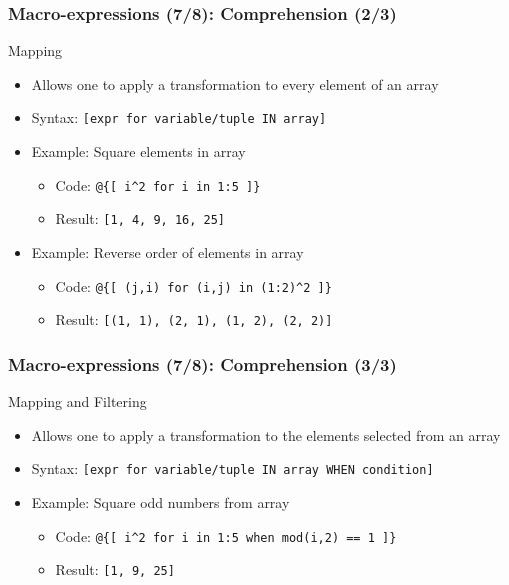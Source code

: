 \documentclass{beamer}
\begin{document}
\begin{frame}[fragile=singleslide]
  \frametitle{Macro-expressions (7/8): Comprehension (2/3)}
  \begin{block}{Mapping}
    \begin{itemize}
    \item Allows one to apply a transformation to every element of an array
    \item Syntax: \texttt{[expr for variable/tuple IN array]}
    \item Example: Square elements in array
      \begin{itemize}
      \item Code: \texttt{@\{[ i\^{}2 for i in 1:5 ]\}}
      \item Result: \texttt{[1, 4, 9, 16, 25]}
      \end{itemize}
    \item Example: Reverse order of elements in array
      \begin{itemize}
      \item Code: \texttt{@\{[ (j,i) for (i,j) in (1:2)\^{}2 ]\}}
      \item Result: \texttt{[(1, 1), (2, 1), (1, 2), (2, 2)]}
      \end{itemize}
    \end{itemize}
  \end{block}
\end{frame}

\begin{frame}[fragile=singleslide]
  \frametitle{Macro-expressions (7/8): Comprehension (3/3)}
  \begin{block}{Mapping and Filtering}
    \begin{itemize}
    \item Allows one to apply a transformation to the elements selected from an array
    \item Syntax: \texttt{[expr for variable/tuple IN array WHEN condition]}
    \item Example: Square odd numbers from array
      \begin{itemize}
      \item Code: \texttt{@\{[ i\^{}2 for i in 1:5 when mod(i,2) == 1 ]\}}
      \item Result: \texttt{[1, 9, 25]}
      \end{itemize}
    \end{itemize}
  \end{block}
\end{frame}
\end{document}

